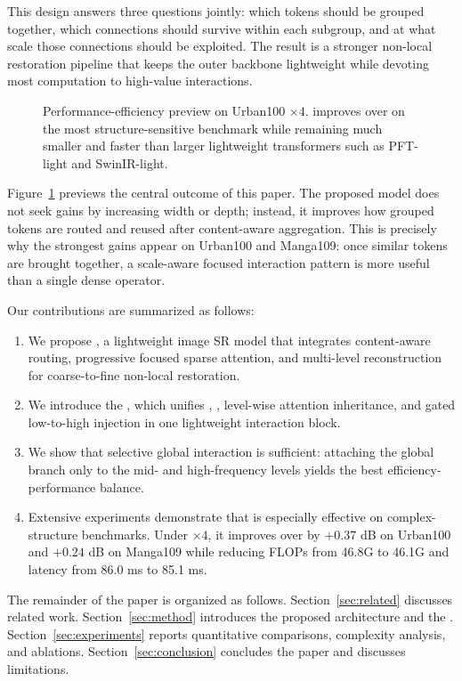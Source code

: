 This design answers three questions jointly: which tokens should be grouped together, which connections should survive within each subgroup, and at what scale those connections should be exploited. The result is a stronger non-local restoration pipeline that keeps the outer backbone lightweight while devoting most computation to high-value interactions.

\begin{figure}[t]
\centering

\caption{Performance-efficiency preview on Urban100 \(\times4\). \method{} improves over \baseline{} on the most structure-sensitive benchmark while remaining much smaller and faster than larger lightweight transformers such as PFT-light and SwinIR-light.}
\label{fig:intro-pareto}
\end{figure}

Figure~\ref{fig:intro-pareto} previews the central outcome of this paper. The proposed model does not seek gains by increasing width or depth; instead, it improves how grouped tokens are routed and reused after content-aware aggregation. This is precisely why the strongest gains appear on Urban100 and Manga109: once similar tokens are brought together, a scale-aware focused interaction pattern is more useful than a single dense operator.

Our contributions are summarized as follows:
\begin{enumerate}[leftmargin=1.2em]
    \item We propose \method{}, a lightweight image SR model that integrates content-aware routing, progressive focused sparse attention, and multi-level reconstruction for coarse-to-fine non-local restoration.
    \item We introduce the \moduleName{}, which unifies \dpr{}, \pfsa{}, level-wise attention inheritance, and gated low-to-high injection in one lightweight interaction block.
    \item We show that selective global interaction is sufficient: attaching the global branch only to the mid- and high-frequency levels yields the best efficiency-performance balance.
    \item Extensive experiments demonstrate that \method{} is especially effective on complex-structure benchmarks. Under \(\times4\), it improves over \baseline{} by \(+0.37\) dB on Urban100 and \(+0.24\) dB on Manga109 while reducing FLOPs from 46.8G to 46.1G and latency from 86.0 ms to 85.1 ms.
\end{enumerate}

The remainder of the paper is organized as follows. Section~\ref{sec:related} discusses related work. Section~\ref{sec:method} introduces the proposed architecture and the \moduleName{}. Section~\ref{sec:experiments} reports quantitative comparisons, complexity analysis, and ablations. Section~\ref{sec:conclusion} concludes the paper and discusses limitations.
